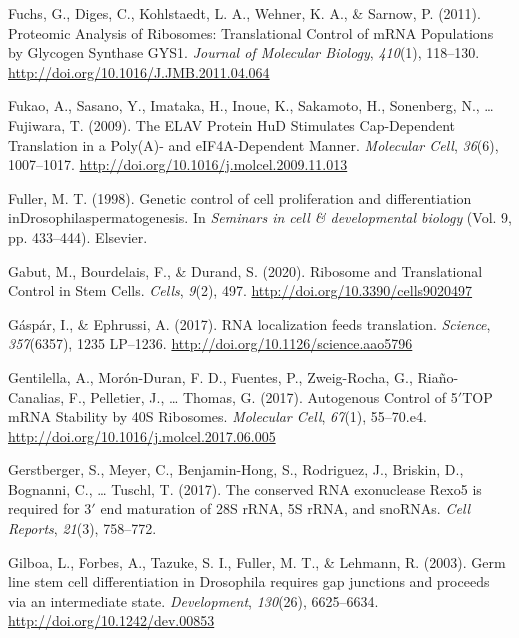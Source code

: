 \documentclass[12pt,oneside]{reedthesis}
\newlength{\cslhangindent}
\newenvironment{cslreferences}%
  {\setlength{\parindent}{0pt}%
  \everypar{\setlength{\hangindent}{\cslhangindent}}\ignorespaces}%
  {\par}
\begin{document}
\begin{cslreferences}
\leavevmode\hypertarget{ref-fuchsProteomicAnalysisRibosomes2011}{}%
Fuchs, G., Diges, C., Kohlstaedt, L. A., Wehner, K. A., \& Sarnow, P. (2011). Proteomic Analysis of Ribosomes: Translational Control of mRNA Populations by Glycogen Synthase GYS1. \emph{Journal of Molecular Biology}, \emph{410}(1), 118--130. \url{http://doi.org/10.1016/J.JMB.2011.04.064}

\leavevmode\hypertarget{ref-Fukao2009c}{}%
Fukao, A., Sasano, Y., Imataka, H., Inoue, K., Sakamoto, H., Sonenberg, N., \ldots{} Fujiwara, T. (2009). The ELAV Protein HuD Stimulates Cap-Dependent Translation in a Poly(A)- and eIF4A-Dependent Manner. \emph{Molecular Cell}, \emph{36}(6), 1007--1017. \url{http://doi.org/10.1016/j.molcel.2009.11.013}

\leavevmode\hypertarget{ref-Fuller1998c}{}%
Fuller, M. T. (1998). Genetic control of cell proliferation and differentiation inDrosophilaspermatogenesis. In \emph{Seminars in cell \& developmental biology} (Vol. 9, pp. 433--444). Elsevier.

\leavevmode\hypertarget{ref-gabutRibosomeTranslationalControl2020}{}%
Gabut, M., Bourdelais, F., \& Durand, S. (2020). Ribosome and Translational Control in Stem Cells. \emph{Cells}, \emph{9}(2), 497. \url{http://doi.org/10.3390/cells9020497}

\leavevmode\hypertarget{ref-Gaspar2017b}{}%
Gáspár, I., \& Ephrussi, A. (2017). RNA localization feeds translation. \emph{Science}, \emph{357}(6357), 1235 LP--1236. \url{http://doi.org/10.1126/science.aao5796}

\leavevmode\hypertarget{ref-gentilellaAutogenousControlTOP2017}{}%
Gentilella, A., Morón-Duran, F. D., Fuentes, P., Zweig-Rocha, G., Riaño-Canalias, F., Pelletier, J., \ldots{} Thomas, G. (2017). Autogenous Control of 5\({'}\)TOP mRNA Stability by 40S Ribosomes. \emph{Molecular Cell}, \emph{67}(1), 55--70.e4. \url{http://doi.org/10.1016/j.molcel.2017.06.005}

\leavevmode\hypertarget{ref-Gerstberger2017}{}%
Gerstberger, S., Meyer, C., Benjamin-Hong, S., Rodriguez, J., Briskin, D., Bognanni, C., \ldots{} Tuschl, T. (2017). The conserved RNA exonuclease Rexo5 is required for 3\({'}\) end maturation of 28S rRNA, 5S rRNA, and snoRNAs. \emph{Cell Reports}, \emph{21}(3), 758--772.

\leavevmode\hypertarget{ref-gilboaGermLineStem2003}{}%
Gilboa, L., Forbes, A., Tazuke, S. I., Fuller, M. T., \& Lehmann, R. (2003). Germ line stem cell differentiation in Drosophila requires gap junctions and proceeds via an intermediate state. \emph{Development}, \emph{130}(26), 6625--6634. \url{http://doi.org/10.1242/dev.00853}


\end{cslreferences}
\end{document}
